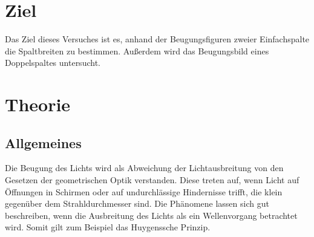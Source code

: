 \section{Ziel}
Das Ziel dieses Versuches ist es, anhand der Beugungsfiguren
zweier Einfachspalte die Spaltbreiten zu bestimmen.
Außerdem wird das Beugungsbild eines Doppelspaltes
untersucht. %

\section{Theorie}
\label{sec:Theorie}

\subsection{Allgemeines}
Die Beugung des Lichts wird als Abweichung der 
Lichtausbreitung von den Gesetzen der geometrischen Optik 
verstanden. Diese treten auf, wenn Licht auf Öffnungen in 
Schirmen oder auf undurchlässige Hindernisse trifft, die klein
gegenüber dem Strahldurchmesser sind. Die 
Phänomene lassen sich gut beschreiben, wenn die 
Ausbreitung des Lichts als ein Wellenvorgang betrachtet wird. 
Somit gilt zum Beispiel das Huygenssche Prinzip. %

